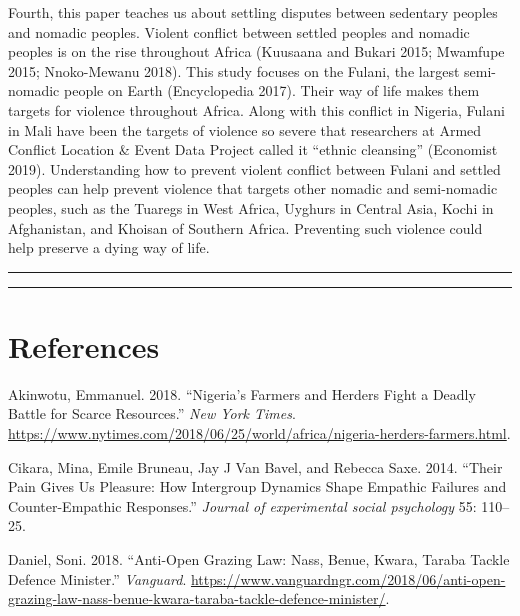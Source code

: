 \documentclass[11pt]{article}
\begin{document}
Fourth, this paper teaches us about settling disputes between sedentary
peoples and nomadic peoples. Violent conflict between settled peoples
and nomadic peoples is on the rise throughout Africa (Kuusaana and
Bukari 2015; Mwamfupe 2015; Nnoko-Mewanu 2018). This study focuses on
the Fulani, the largest semi-nomadic people on Earth (Encyclopedia
2017). Their way of life makes them targets for violence throughout
Africa. Along with this conflict in Nigeria, Fulani in Mali have been
the targets of violence so severe that researchers at Armed Conflict
Location \& Event Data Project called it ``ethnic cleansing'' (Economist
2019). Understanding how to prevent violent conflict between Fulani and
settled peoples can help prevent violence that targets other nomadic and
semi-nomadic peoples, such as the Tuaregs in West Africa, Uyghurs in
Central Asia, Kochi in Afghanistan, and Khoisan of Southern Africa.
Preventing such violence could help preserve a dying way of life.

\begin{center}\rule{0.5\linewidth}{\linethickness}\end{center}

\begin{center}\rule{0.5\linewidth}{\linethickness}\end{center}

\hypertarget{references}{%
\section*{References}\label{references}}

\hypertarget{refs}{}
\leavevmode\hypertarget{ref-nyt2018nigeria}{}%
Akinwotu, Emmanuel. 2018. ``Nigeria's Farmers and Herders Fight a Deadly
Battle for Scarce Resources.'' \emph{New York Times}.
\url{https://www.nytimes.com/2018/06/25/world/africa/nigeria-herders-farmers.html}.

\leavevmode\hypertarget{ref-cikara2014their}{}%
Cikara, Mina, Emile Bruneau, Jay J Van Bavel, and Rebecca Saxe. 2014.
``Their Pain Gives Us Pleasure: How Intergroup Dynamics Shape Empathic
Failures and Counter-Empathic Responses.'' \emph{Journal of experimental
social psychology} 55: 110--25.

\leavevmode\hypertarget{ref-daniel2018anti}{}%
Daniel, Soni. 2018. ``Anti-Open Grazing Law: Nass, Benue, Kwara, Taraba
Tackle Defence Minister.'' \emph{Vanguard}.
\url{https://www.vanguardngr.com/2018/06/anti-open-grazing-law-nass-benue-kwara-taraba-tackle-defence-minister/}.
\end{document}
